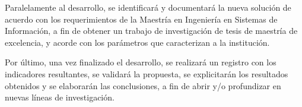 \bigskip Paralelamente al desarrollo, se identificará y documentará la nueva solución de acuerdo con los requerimientos de la Maestría en Ingeniería en Sistemas de Información, a fin de obtener un trabajo de investigación de tesis de maestría de excelencia, y acorde con los parámetros que caracterizan a la institución.

\bigskip Por último, una vez finalizado el desarrollo, se realizará un registro con los indicadores resultantes, se validará la propuesta, se explicitarán los resultados obtenidos y se elaborarán las conclusiones, a fin de abrir y/o profundizar en nuevas líneas de investigación.